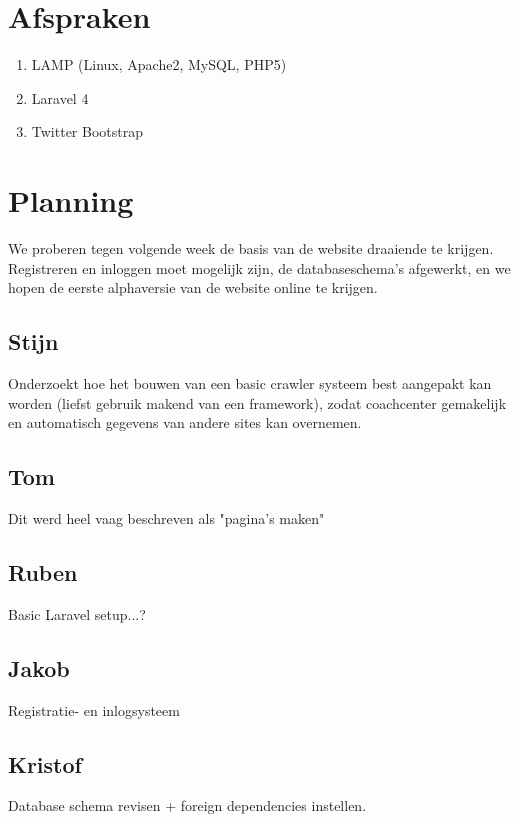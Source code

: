 \documentclass[11pt, a4paper]{article}
\begin{document}
\section{Afspraken}
\begin{enumerate}
\item LAMP (Linux, Apache2, MySQL, PHP5)
\item Laravel 4
\item Twitter Bootstrap
\end{enumerate}


\section{Planning}
We proberen tegen volgende week de basis van de website draaiende te krijgen. Registreren en inloggen moet mogelijk zijn, de databaseschema's afgewerkt, en we hopen de eerste alphaversie van de website online te krijgen.
\subsection{Stijn}
Onderzoekt hoe het bouwen van een basic crawler systeem best aangepakt kan
worden (liefst gebruik makend van een framework), zodat coachcenter gemakelijk
en automatisch gegevens van andere sites kan overnemen.
\subsection{Tom}
Dit werd heel vaag beschreven als "pagina's maken"
\subsection{Ruben}
Basic Laravel setup...?
\subsection{Jakob}
Registratie- en inlogsysteem
\subsection{Kristof}
Database schema revisen + foreign dependencies instellen.
\end{document}

